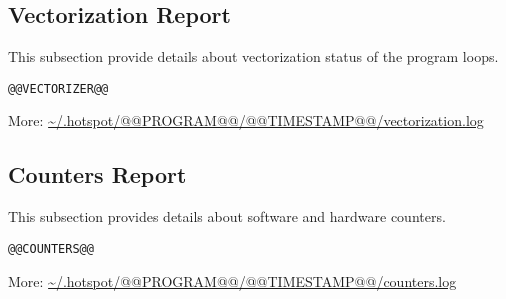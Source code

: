 \documentclass[a4paper]{article}
\begin{document}
\subsection{Vectorization Report}

This subsection provide details about vectorization status of the program loops.

\begin{verbatim}
@@VECTORIZER@@
\end{verbatim}

More: \url{~/.hotspot/@@PROGRAM@@/@@TIMESTAMP@@/vectorization.log}

\subsection{Counters Report}

This subsection provides details about software and hardware counters.

\begin{verbatim}
@@COUNTERS@@
\end{verbatim}

More: \url{~/.hotspot/@@PROGRAM@@/@@TIMESTAMP@@/counters.log}
\end{document}
